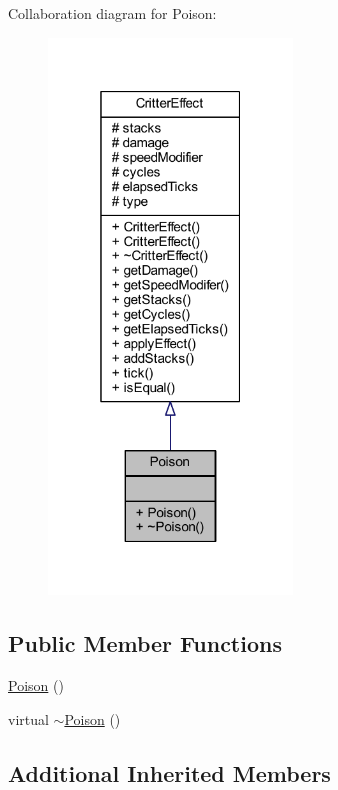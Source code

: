 Collaboration diagram for Poison\+:\nopagebreak
\begin{figure}[H]
\begin{center}
\leavevmode
\includegraphics[width=184pt]{struct_poison__coll__graph}
\end{center}
\end{figure}
\subsection*{Public Member Functions}
\begin{DoxyCompactItemize}
\item 
\hyperlink{struct_poison_aab6ccb2536a87ae8d9204168f0da0f66}{Poison} ()
\item 
virtual \hyperlink{struct_poison_ad296dc6dd102fb118ad5895d37af0fdd}{$\sim$\+Poison} ()
\end{DoxyCompactItemize}
\subsection*{Additional Inherited Members}


